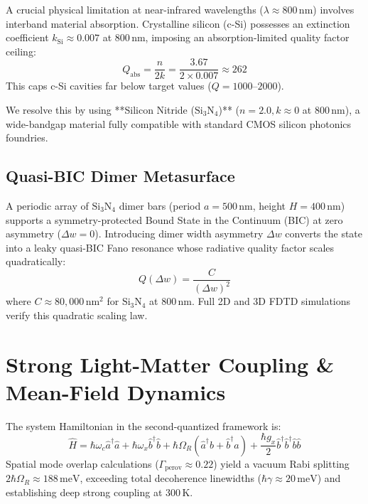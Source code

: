 \documentclass[10pt, conference]{IEEEtran}
\begin{document}
A crucial physical limitation at near-infrared wavelengths ($\lambda \approx 800\,\text{nm}$) involves interband material absorption. Crystalline silicon (c-Si) possesses an extinction coefficient $k_{\text{Si}} \approx 0.007$ at $800\,\text{nm}$, imposing an absorption-limited quality factor ceiling:
\begin{equation}
Q_{\text{abs}} = \frac{n}{2k} = \frac{3.67}{2 \times 0.007} \approx 262
\end{equation}
This caps c-Si cavities far below target values ($Q = 1000$--$2000$).

We resolve this by using **Silicon Nitride ($\text{Si}_3\text{N}_4$)** ($n = 2.0, k \approx 0$ at $800\,\text{nm}$), a wide-bandgap material fully compatible with standard CMOS silicon photonics foundries.

\subsection{Quasi-BIC Dimer Metasurface}

A periodic array of $\text{Si}_3\text{N}_4$ dimer bars (period $a = 500\,\text{nm}$, height $H = 400\,\text{nm}$) supports a symmetry-protected Bound State in the Continuum (BIC) at zero asymmetry ($\Delta w = 0$). Introducing dimer width asymmetry $\Delta w$ converts the state into a leaky quasi-BIC Fano resonance whose radiative quality factor scales quadratically:
\begin{equation}
Q(\Delta w) = \frac{C}{(\Delta w)^2}
\end{equation}
where $C \approx 80{,}000\,\text{nm}^2$ for $\text{Si}_3\text{N}_4$ at $800\,\text{nm}$. Full 2D and 3D FDTD simulations verify this quadratic scaling law.

\section{Strong Light-Matter Coupling \& Mean-Field Dynamics}
\label{sec:dynamics}

The system Hamiltonian in the second-quantized framework is:
\begin{equation}
\hat{H} = \hbar\omega_c \hat{a}^\dagger \hat{a} + \hbar\omega_x \hat{b}^\dagger \hat{b} + \hbar\Omega_R(\hat{a}^\dagger\hat{b} + \hat{b}^\dagger\hat{a}) + \frac{\hbar g_x}{2}\hat{b}^\dagger\hat{b}^\dagger\hat{b}\hat{b}
\end{equation}
Spatial mode overlap calculations ($\Gamma_{\text{perov}} \approx 0.22$) yield a vacuum Rabi splitting $2\hbar\Omega_R \approx 188\,\text{meV}$, exceeding total decoherence linewidths ($\hbar\gamma \approx 20\,\text{meV}$) and establishing deep strong coupling at $300\,\text{K}$.
\end{document}
